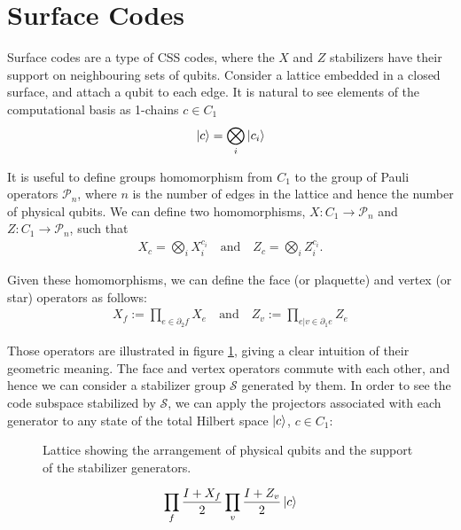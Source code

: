 \documentclass[12pt, twoside, openany]{book}
\begin{document}
\section{Surface Codes}

Surface codes are a type of CSS codes, where the $X$ and $Z$ stabilizers have their support on neighbouring sets of qubits. Consider a lattice embedded in a closed surface, and attach a qubit to each edge. It is natural to see elements of the computational basis as 1-chains $c \in C_1$
\begin{align}
    \ket{c} = \bigotimes_i \ket{c_i} 
\end{align}

It is useful to define groups homomorphism from $C_1$ to the group of Pauli operators $\mathcal{P}_n$, where $n$ is the number of edges in the lattice and hence the number of physical qubits. We can define two homomorphisms, $X: C_1 \rightarrow \mathcal{P}_n$ and $Z: C_1 \rightarrow \mathcal{P}_n$, such that 
\begin{align}
    X_c = \bigotimes_i X^{c_i}_i \quad \text{and} \quad Z_c = \bigotimes_i Z^{c_i}_i.
\end{align}

Given these homomorphisms, we can define the face (or plaquette) and vertex (or star) operators as follows:
\begin{align}
X_f:= \prod _{e \in \partial_2 f} X_e \quad \text{and} \quad Z_v := \prod _{e |v \in \partial_1 e} Z_e
\end{align}

Those operators are illustrated in figure \ref{fig:surface_code}, giving a clear intuition of their geometric meaning. The face and vertex operators commute with each other, and hence we can consider a stabilizer group $\mathcal{S}$ generated by them. In order to see the code subspace stabilized by $\mathcal{S}$, we can apply the projectors associated with each generator to any state of the total Hilbert space $\ket{c}$, $c \in C_1$:

\begin{figure}
\centering

\caption{Lattice showing the arrangement of physical qubits and the support of the stabilizer generators.}
\label{fig:surface_code}
\end{figure}

\begin{align*}
    \prod_{f} \frac{I + X_f}{2} \prod_{v} \frac{I + Z_v}{2} \ket{c} \\
\end{align*}
\end{document}
